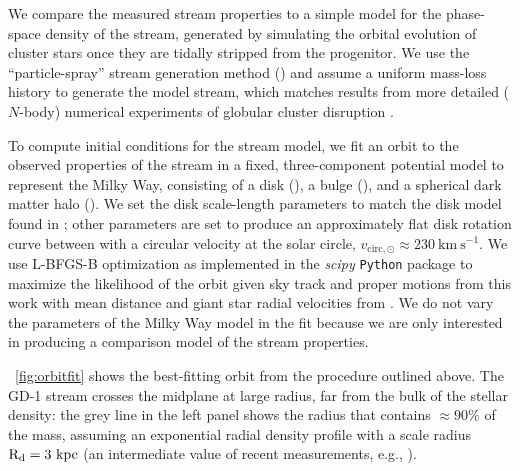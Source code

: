 \documentclass[modern]{aastex62}
\newcommand{\package}[1]{\textsl{#1}}
\newcommand{\kpc}{\textrm{kpc}}
\newcommand{\kms}{\ensuremath{\textrm{km}~\textrm{s}^{-1}}}
\begin{document}
We compare the measured stream properties to a simple model for the phase-space
density of the stream, generated by simulating the orbital evolution of cluster
stars once they are tidally stripped from the progenitor.
We use the ``particle-spray'' stream generation method (\citealt{Fardal:2015})
and assume a uniform mass-loss history to generate the model stream, which
matches results from more detailed ($N$-body) numerical experiments of globular
cluster disruption \citep[e.g.,][]{Kupper:2012}.

To compute initial conditions for the stream model, we fit an orbit to the
observed properties of the stream in a fixed, three-component potential model
to represent the Milky Way, consisting of a disk (\citealt{Miyamoto:1975}), a
bulge (\citealt{Hernquist:1990}), and a spherical dark matter halo
(\citealt{Navarro:1996}).
We set the disk scale-length parameters to match the disk model found in
\citet{Bovy:2015}; other parameters are set to produce an approximately flat
disk rotation curve between with a circular velocity at the solar circle,
$v_{\textrm{circ}, \odot} \approx 230~\kms$.
We use L-BFGS-B optimization as implemented in the \package{scipy}
\texttt{Python} package to maximize the likelihood of the orbit given sky track
and proper motions from this work with mean distance and giant star radial
velocities from \cite{Koposov:2010}.
We do not vary the parameters of the Milky Way model in the fit because we are
only interested in producing a comparison model of the stream properties.

\figurename~\ref{fig:orbitfit} shows the best-fitting orbit from the procedure
outlined above.
The GD-1 stream crosses the midplane at large radius, far from the bulk of the
stellar density:
the grey line in the left panel shows the radius that contains $\approx 90\%$ of
the mass, assuming an exponential radial density profile with a scale radius
$\rm R_d = 3~\kpc$ (an intermediate value of recent measurements, e.g.,
\citealt{Bovy:2012}).
\end{document}
